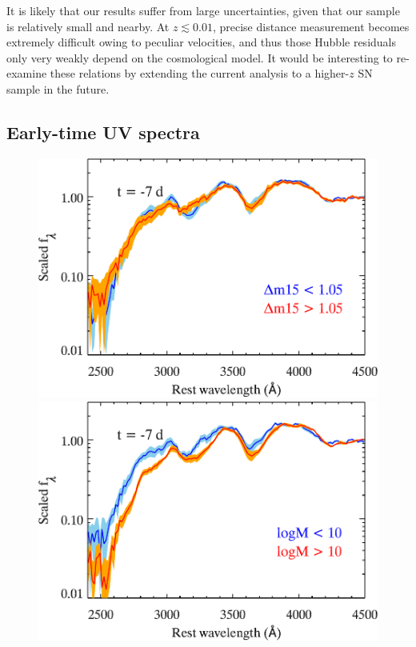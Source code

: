 \documentclass[useAMS,usenatbib]{mn2e}
\begin{document}
It is likely that our results suffer from large uncertainties, given that our sample is relatively small and nearby. At $z\lesssim0.01$, precise distance measurement becomes extremely difficult owing to peculiar velocities, and thus those Hubble residuals only very weakly depend on the cosmological model. It would be interesting to re-examine these relations by extending the current analysis to a higher-$z$ SN sample in the future.

\subsection{Early-time UV spectra}
\label{sec:early}
\begin{figure}
	\centering
	    \includegraphics[scale=0.47]{plot/mean_spec_premax_dm15_log.pdf}\\
		\vspace{0.25cm}
		\includegraphics[scale=0.47]{plot/mean_spec_premax_mass_log.pdf}\\

\end{figure}
\end{document}
